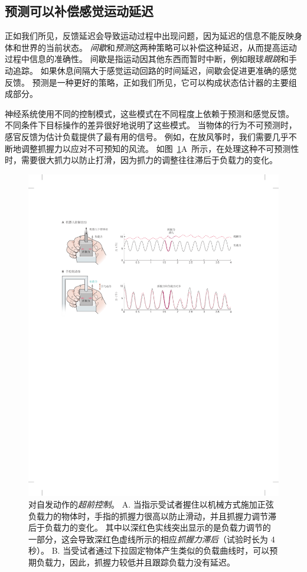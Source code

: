 \subsection{预测可以补偿感觉运动延迟}

正如我们所见，反馈延迟会导致运动过程中出现问题，因为延迟的信息不能反映身体和世界的当前状态。
\textit{间歇}和\textit{预测}这两种策略可以补偿这种延迟，从而提高运动过程中信息的准确性。
间歇是指运动因其他东西而暂时中断，例如眼球\textit{眼跳}和手动追踪。
如果休息间隔大于感觉运动回路的时间延迟，间歇会促进更准确的感觉反馈。
预测是一种更好的策略，正如我们所见，它可以构成状态估计器的主要组成部分。


神经系统使用不同的控制模式，这些模式在不同程度上依赖于预测和感觉反馈。
不同条件下目标操作的差异很好地说明了这些模式。
当物体的行为不可预测时，感官反馈为估计负载提供了最有用的信号。
例如，在放风筝时，我们需要几乎不断地调整抓握力以应对不可预知的风流。 
如图~\ref{fig:30_6}A~所示，在处理这种不可预测性时，需要很大抓力以防止打滑，因为抓力的调整往往滞后于负载力的变化。


\begin{figure}[htbp]
	\centering
	\includegraphics[width=1.0\linewidth]{chap30/fig_30_6}
	\caption{对自发动作的\textit{超前控制}\cite{blakemore1998predicting}。
		A. 当指示受试者握住以机械方式施加正弦负载力的物体时，手指的抓握力很高以防止滑动，并且抓握力调节滞后于负载力的变化。
		其中以深红色实线突出显示的是负载力调节的一部分，这会导致深红色虚线所示的相应\textit{抓握力滞后}（试验时长为 4 秒）。
		B. 当受试者通过下拉固定物体产生类似的负载曲线时，可以预期负载力，因此，抓握力较低并且跟踪负载力没有延迟。}
	\label{fig:30_6}
\end{figure}


